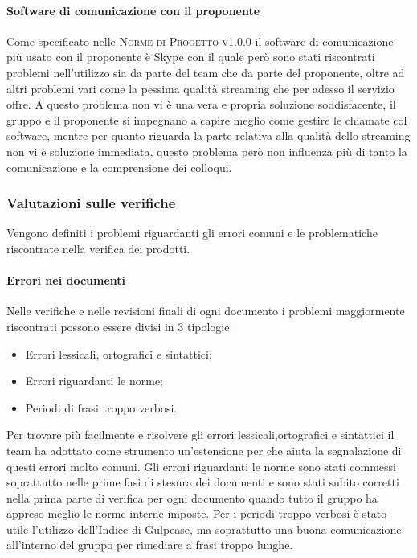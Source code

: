 \documentclass[../piano-di-qualifica.tex]{subfiles}
\begin{document}
\paragraph{Software di comunicazione con il proponente}
\label{sub:latex}
Come specificato nelle \textsc{Norme di Progetto v1.0.0} il software di comunicazione più usato con il proponente è Skype con il quale però sono stati riscontrati problemi nell'utilizzo sia da parte del team che da parte del proponente, oltre ad altri problemi vari come la pessima qualità streaming che per adesso il servizio offre.
A questo problema non vi è una vera e propria soluzione soddisfacente, il gruppo e il proponente si impegnano a capire meglio come gestire le chiamate col software, mentre per quanto riguarda la parte relativa alla qualità dello streaming non vi è soluzione immediata, questo problema però non influenza più di tanto la comunicazione e la comprensione dei colloqui.

\subsubsection{Valutazioni sulle verifiche}
\label{sssec:valutazioni_verifiche}
Vengono definiti i problemi riguardanti gli errori comuni e le problematiche riscontrate nella verifica dei prodotti.

\paragraph{Errori nei documenti}
\label{sub:errori_documenti}
Nelle verifiche e nelle revisioni finali di ogni documento i problemi maggiormente riscontrati possono essere divisi in 3 tipologie:
\begin{itemize}
    \item Errori lessicali, ortografici e sintattici;
    \item Errori riguardanti le norme;
    \item Periodi di frasi troppo verbosi.
\end{itemize}
Per trovare più facilmente e risolvere gli errori lessicali,ortografici e sintattici il team ha adottato come strumento un'estensione per  che aiuta la segnalazione di questi errori molto comuni.
Gli errori riguardanti le norme sono stati commessi soprattutto nelle prime fasi di stesura dei documenti e sono stati subito corretti nella prima parte di verifica per ogni documento quando tutto il gruppo ha appreso meglio le norme interne imposte.
Per i periodi troppo verbosi è stato utile l'utilizzo dell'Indice di Gulpease, ma soprattutto una buona comunicazione all'interno del gruppo per rimediare a frasi troppo lunghe.
\end{document}
